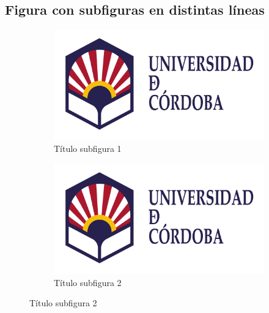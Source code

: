 \subsection{Figura con subfiguras en distintas líneas}
\begin{figure}[H]
\begin{subfigure}{.5\textwidth}
  \centering
  \includegraphics[width=.8\linewidth]{Imagenes/logo_uco}  
  \caption{Título subfigura 1}
  \label{fig:sub-first}
\end{subfigure}
\begin{subfigure}{.5\textwidth}
  \centering
  \includegraphics[width=.8\linewidth]{Imagenes/logo_uco}  
  \caption{Título subfigura 2}
  \label{fig:sub-second}
\end{subfigure}


\end{figure}
